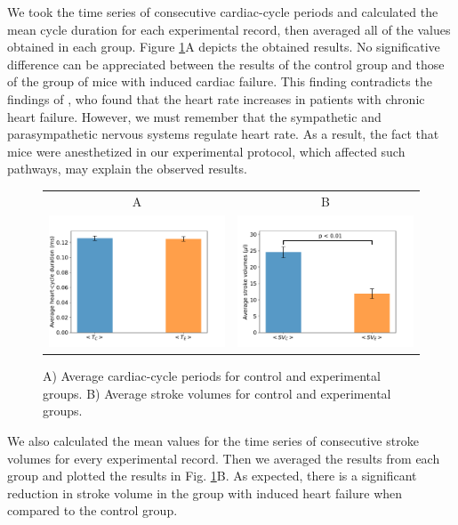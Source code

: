 \documentclass[%
preprint,
 amsmath,amssymb,
 aps,
]{revtex4-2}
\begin{document}
We took the time series of consecutive cardiac-cycle periods and calculated the mean cycle duration for each experimental record, then averaged all of the values obtained in each group. Figure \ref{fig:fig01}A depicts the obtained results. No significative difference can be appreciated between the results of the control group and those of the group of mice with induced cardiac failure. This finding contradicts the findings of \citet{Kamen_1995}, who found that the heart rate increases in patients with chronic heart failure. However, we must remember that the sympathetic and parasympathetic nervous systems regulate heart rate. As a result, the fact that mice were anesthetized in our experimental protocol, which affected such pathways, may explain the observed results.

\begin{figure}[h!]
    \begin{tabular}{cc}
        A & B \\
        \includegraphics[width=3in]{Fig01_A.pdf} &
        \includegraphics[width=3in]{Fig01_B.pdf}
    \end{tabular}
    \caption{A) Average cardiac-cycle periods for control and experimental groups. B) Average stroke volumes for control and experimental groups.}
    \label{fig:fig01}
\end{figure}

We also calculated the mean values for the time series of consecutive stroke volumes for every experimental record. Then we averaged the results from each group and plotted the results in Fig. \ref{fig:fig01}B. As expected, there is a significant reduction in stroke volume in the group with induced heart failure when compared to the control group.
\end{document}
